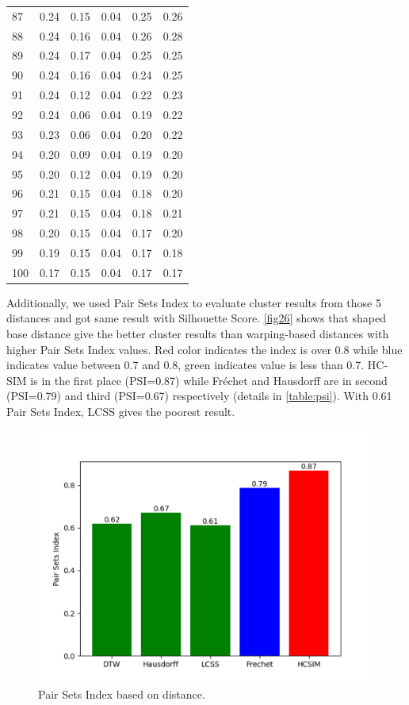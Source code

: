 \documentclass[a4paper, 12pt]{article}
\begin{document}
\begin{tabularx}{\linewidth}{|X|X|X|X|X|X|}
        87 & 0.24 & 0.15 & 0.04 & 0.25 & 0.26 \\
        88 & 0.24 & 0.16 & 0.04 & 0.26 & 0.28 \\
        89 & 0.24 & 0.17 & 0.04 & 0.25 & 0.25 \\
        90 & 0.24 & 0.16 & 0.04 & 0.24 & 0.25 \\
        91 & 0.24 & 0.12 & 0.04 & 0.22 & 0.23 \\
        92 & 0.24 & 0.06 & 0.04 & 0.19 & 0.22 \\
        93 & 0.23 & 0.06 & 0.04 & 0.20 & 0.22 \\
        94 & 0.20 & 0.09 & 0.04 & 0.19 & 0.20 \\
        95 & 0.20 & 0.12 & 0.04 & 0.19 & 0.20 \\
        96 & 0.21 & 0.15 & 0.04 & 0.18 & 0.20 \\
        97 & 0.21 & 0.15 & 0.04 & 0.18 & 0.21 \\
        98 & 0.20 & 0.15 & 0.04 & 0.17 & 0.20 \\
        99 & 0.19 & 0.15 & 0.04 & 0.17 & 0.18 \\
        100 & 0.17 & 0.15 & 0.04 & 0.17 & 0.17
    \label{table:mopsi_silhouette}
\end{tabularx}
    
Additionally, we used Pair Sets Index to evaluate cluster results from those 5 distances and got same result with Silhouette Score. \autoref{fig26} shows that shaped base distance give the better cluster results than warping-based distances with higher Pair Sets Index values. Red color indicates the index is over 0.8 while blue indicates value between 0.7 and 0.8, green indicates value is less than 0.7. HC-SIM is in the first place (PSI=0.87) while Fréchet and Hausdorff are in second (PSI=0.79) and third (PSI=0.67) respectively (details in \autoref{table:psi}). With 0.61 Pair Sets Index, LCSS gives the poorest result.

\begin{figure}[htbp!]
    \centering
    \includegraphics[width=1\textwidth]{pair_sets_index.png}
    \caption{Pair Sets Index based on distance.}
    \label{fig26}
\end{figure}
\end{document}
